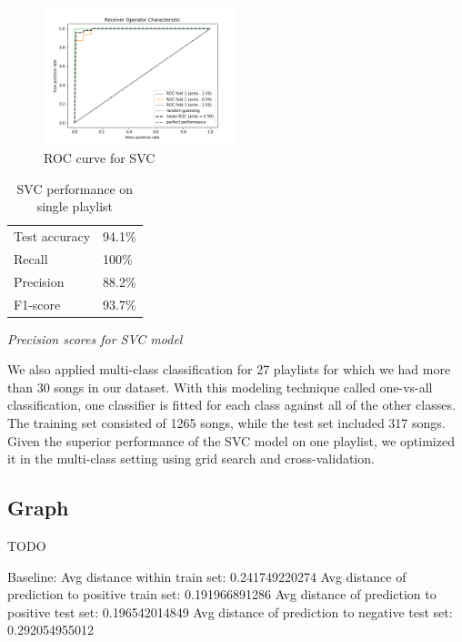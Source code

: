 \documentclass[acmtog]{acmart}
\begin{document}
\begin{figure}[h]
  \includegraphics[width=0.5\textwidth]{ROC_curve}
  \caption{ROC curve for SVC}
  \label{fig:ROC_curve}
\end{figure}

\newpage
\begin{table}%
\caption{SVC performance on single playlist}
\label{tab:one}
\begin{minipage}{\columnwidth}
\begin{center}
\begin{tabular}{ll}
  \toprule
  Test accuracy    & 94.1\%\\
  Recall  & 100\%\\
  Precision    & 88.2\%\\
  F1-score    & 93.7\%\\
  \bottomrule
\end{tabular}
\end{center}
\bigskip\centering
\footnotesize
 \emph{Precision scores for SVC model}
\end{minipage}
\end{table}%
\newpage
We also applied multi-class classification for 27 playlists for which we had more than 30 songs in our dataset. With this modeling technique called one-vs-all classification, one classifier is fitted for each class against all of the other classes. The training set consisted of 1265 songs, while the test set included 317 songs. Given the superior performance of the SVC model on one playlist, we optimized it in the multi-class setting using grid search and cross-validation.

\subsection{Graph}

TODO

Baseline: Avg distance within train set:          0.241749220274
Avg distance of prediction to positive train set: 0.191966891286
Avg distance of prediction to positive test set:  0.196542014849
Avg distance of prediction to negative test set:  0.292054955012
\end{document}
